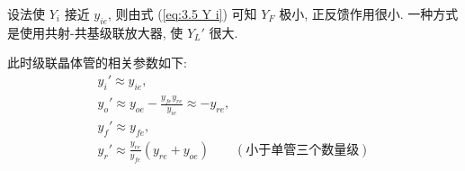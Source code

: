 设法使 $Y_i$ 接近 $y_{ie}$, 则由式 (\ref{eq:3.5 Y i}) 可知 $Y_F$ 极小, 正反馈作用很小. 一种方式是使用共射-共基级联放大器, 使 $Y_L'$ 很大.

此时级联晶体管的相关参数如下:
\begin{gather}
    y_i'\approx y_{ie}, \\
    y_o'\approx y_{oe}-\frac{y_{fe}y_{re}}{y_{ie}}\approx -y_{re}, \\
    y_f'\approx y_{fe}, \\
    y_r'\approx \frac{y_{re}}{y_{fe}}(y_{re}+y_{oe}) \qquad (\textrm{小于单管三个数量级})
\end{gather}
